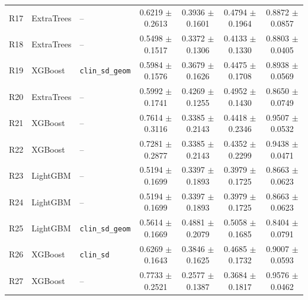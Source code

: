\begin{landscape}
\begin{longtable}{rllcccc}
R17 & ExtraTrees & -- & 0.6219 $\pm$ 0.2613 & 0.3936 $\pm$ 0.1601 & 0.4794 $\pm$ 0.1964 & 0.8872 $\pm$ 0.0857 \\
R18 & ExtraTrees & -- & 0.5498 $\pm$ 0.1517 & 0.3372 $\pm$ 0.1306 & 0.4133 $\pm$ 0.1330 & 0.8803 $\pm$ 0.0405 \\
R19 & XGBoost & \texttt{clin\_sd\_geom} & 0.5984 $\pm$ 0.1576 & 0.3679 $\pm$ 0.1626 & 0.4475 $\pm$ 0.1708 & 0.8938 $\pm$ 0.0569 \\
R20 & ExtraTrees & -- & 0.5992 $\pm$ 0.1741 & 0.4269 $\pm$ 0.1255 & 0.4952 $\pm$ 0.1430 & 0.8650 $\pm$ 0.0749 \\
R21 & XGBoost & -- & 0.7614 $\pm$ 0.3116 & 0.3385 $\pm$ 0.2143 & 0.4418 $\pm$ 0.2346 & 0.9507 $\pm$ 0.0532 \\
R22 & XGBoost & -- & 0.7281 $\pm$ 0.2877 & 0.3385 $\pm$ 0.2143 & 0.4352 $\pm$ 0.2299 & 0.9438 $\pm$ 0.0471 \\
R23 & LightGBM & -- & 0.5194 $\pm$ 0.1699 & 0.3397 $\pm$ 0.1893 & 0.3979 $\pm$ 0.1725 & 0.8663 $\pm$ 0.0623 \\
R24 & LightGBM & -- & 0.5194 $\pm$ 0.1699 & 0.3397 $\pm$ 0.1893 & 0.3979 $\pm$ 0.1725 & 0.8663 $\pm$ 0.0623 \\
R25 & LightGBM & \texttt{clin\_sd\_geom} & 0.5614 $\pm$ 0.1669 & 0.4881 $\pm$ 0.2079 & 0.5058 $\pm$ 0.1685 & 0.8404 $\pm$ 0.0791 \\
R26 & XGBoost & \texttt{clin\_sd} & 0.6269 $\pm$ 0.1643 & 0.3846 $\pm$ 0.1625 & 0.4685 $\pm$ 0.1732 & 0.9007 $\pm$ 0.0593 \\
R27 & XGBoost & -- & 0.7733 $\pm$ 0.2521 & 0.2577 $\pm$ 0.1387 & 0.3684 $\pm$ 0.1817 & 0.9576 $\pm$ 0.0462 \\
\end{longtable}
\endgroup
\end{landscape}


